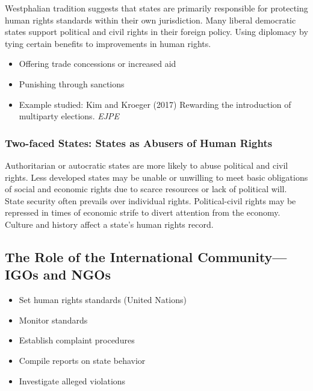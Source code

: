 \documentclass[
]{book}
\begin{document}
Westphalian tradition suggests that states are primarily responsible for protecting human rights standards within their own jurisdiction. Many liberal democratic states support political and civil rights in their foreign policy. Using diplomacy by tying certain benefits to improvements in human rights.

\begin{itemize}
\item
  Offering trade concessions or increased aid
\item
  Punishing through sanctions
\item
  Example studied: Kim and Kroeger (2017) Rewarding the introduction of multiparty elections. \emph{EJPE}
\end{itemize}

\hypertarget{two-faced-states-states-as-abusers-of-human-rights}{%
\subsubsection{Two-faced States: States as Abusers of Human Rights}\label{two-faced-states-states-as-abusers-of-human-rights}}

Authoritarian or autocratic states are more likely to abuse political and civil rights. Less developed states may be unable or unwilling to meet basic obligations of social and economic rights due to scarce resources or lack of political will. State security often prevails over individual rights. Political-civil rights may be repressed in times of economic strife to divert attention from the economy. Culture and history affect a state's human rights record.

\hypertarget{the-role-of-the-international-communityigos-and-ngos}{%
\subsection{The Role of the International Community---IGOs and NGOs}\label{the-role-of-the-international-communityigos-and-ngos}}

\begin{itemize}
\item
  Set human rights standards (United Nations)
\item
  Monitor standards
\item
  Establish complaint procedures
\item
  Compile reports on state behavior
\item
  Investigate alleged violations
\end{itemize}
\end{document}
